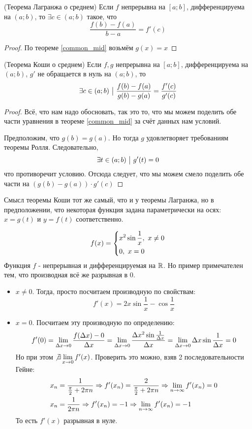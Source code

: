 \begin{corollary} (Теорема Лагранжа о среднем)
	Если $f$ непрерывна на $[a; b]$, дифференцируема на $(a; b)$, то $\exists c \in (a; b)$ такое, что
	\[
		\frac{f(b) - f(a)}{b - a} = f'(c)
	\]
\end{corollary}

\begin{proof}
	По теореме \ref{common_mid} возьмём $g(x) = x$
\end{proof}

\begin{corollary} (Теорема Коши о среднем)
	Если $f, g$ непрерывна на $[a; b]$, дифференцируема на $(a; b)$, $g'$ не обращается в нуль на $(a; b)$, то
	\[
		\exists c \in (a; b) \ \big|\  \frac{f(b) - f(a)}{g(b) - g(a)} = \frac{f'(c)}{g'(c)}
	\]
\end{corollary}

\begin{proof}
	Всё, что нам надо обосновать, так это то, что мы можем поделить обе части уравнения в теореме \ref{common_mid} за счёт данных нам условий.
	
	Предположим, что $g(b) = g(a)$. Но тогда $g$ удовлетворяет требованиям теоремы Ролля. Следовательно,
	\[
		\exists t \in (a; b) \ \big|\  g'(t) = 0
	\]
	что противоречит условию. Отсюда следует, что мы можем смело поделить обе части на $(g(b) - g(a)) \cdot g'(c)$
\end{proof}

\begin{note}
	Смысл теоремы Коши тот же самый, что и у теоремы Лагранжа, но в предположении, что некоторая функция задана параметрически на осях: $x = g(t)$ и $y = f(t)$ соответственно.
\end{note}

\begin{example}
	\[
		f(x) = \left\{\begin{aligned}
			&{x^2 \sin \frac{1}{x},\ x \neq 0}
			\\
			&{0,\ x = 0}
		\end{aligned}\right.
	\]
	Функция $f$ - непрерывная и дифференцируемая на $\mathbb{R}$. Но пример примечателен тем, что производная всё же разрывная в 0.
	\begin{itemize}
		\item $x \neq 0$. Тогда, просто посчитаем производную по свойствам:
		\[
			f'(x) = 2x \sin \frac{1}{x} - \cos \frac{1}{x}
		\]
		
		\item $x = 0$. Посчитаем эту производную по определению:
		\[
			f'(0) = \lim\limits_{\Delta x \to 0} \frac{f(\Delta x) - 0}{\Delta x} = \lim\limits_{\Delta x \to 0} \frac{\Delta x^2 \sin \frac{1}{\Delta x}}{\Delta x} = \lim\limits_{\Delta x \to 0} \Delta x \sin \frac{1}{\Delta x} = 0
		\]
		Но при этом $\not\exists \lim\limits_{x \to 0} f'(x)$. Проверить это можно, взяв 2 последовательности Гейне:
		\begin{align*}
			&{x_n = \frac{1}{\frac{\pi}{2} + 2\pi n} \Rightarrow f'(x_n) = \frac{2}{\frac{\pi}{2} + 2\pi n} \Rightarrow \lim\limits_{n \to \infty} f'(x_n) = 0}
			\\
			&{x_n = \frac{1}{2\pi n} \Rightarrow f'(x_n) = -1 \Rightarrow \lim\limits_{n \to \infty} f'(x_n) = -1}
		\end{align*}
		То есть $f'(x)$ разрывная в нуле.
	\end{itemize}
\end{example}

